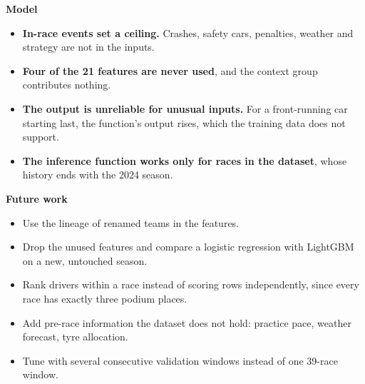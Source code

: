 \documentclass[11pt,a4paper]{article}
\begin{document}
\textbf{Model}

\begin{itemize}
\item \textbf{In-race events set a ceiling.} Crashes, safety cars, penalties, weather and strategy are not in the inputs.
\item \textbf{Four of the 21 features are never used}, and the context group contributes nothing.
\item \textbf{The output is unreliable for unusual inputs.} For a front-running car starting last, the function's output rises, which the training data does not support.
\item \textbf{The inference function works only for races in the dataset}, whose history ends with the 2024 season.
\end{itemize}

\textbf{Future work}

\begin{itemize}
\item Use the lineage of renamed teams in the features.
\item Drop the unused features and compare a logistic regression with LightGBM on a new, untouched season.
\item Rank drivers within a race instead of scoring rows independently, since every race has exactly three podium places.
\item Add pre-race information the dataset does not hold: practice pace, weather forecast, tyre allocation.
\item Tune with several consecutive validation windows instead of one 39-race window.
\end{itemize}
\end{document}
